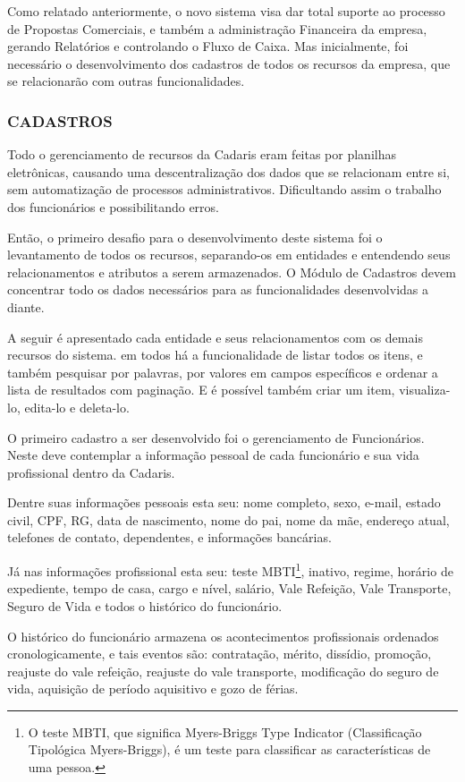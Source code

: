 \documentclass[
  12pt,				%
  openany,
  oneside,
  a4paper,			%
  english,			%
  brazil
]{article}
\numberwithin{figure}{section}
\numberwithin{table}{section}
\newcounter{subsubsubsection}[subsubsection]
\begin{document}
Como relatado anteriormente, o novo sistema visa dar total suporte ao processo de Propostas Comerciais, e também a administração Financeira da empresa, gerando Relatórios e controlando o Fluxo de Caixa. Mas inicialmente, foi necessário o desenvolvimento dos cadastros de todos os recursos da empresa, que se relacionarão com outras funcionalidades.


\subsubsection{CADASTROS}
Todo o gerenciamento de recursos da Cadaris eram feitas por planilhas eletrônicas, causando uma descentralização dos dados que se relacionam entre si, sem automatização de processos administrativos. Dificultando assim o trabalho dos funcionários e possibilitando erros.

Então, o primeiro desafio para o desenvolvimento deste sistema foi o levantamento de todos os recursos, separando-os em entidades e entendendo seus relacionamentos e atributos a serem armazenados. O Módulo de Cadastros devem concentrar todo os dados necessários para as funcionalidades desenvolvidas a diante.

A seguir é apresentado cada entidade e seus relacionamentos com os demais recursos do sistema. em todos há a funcionalidade de listar todos os itens, e também pesquisar por palavras, por valores em campos específicos e ordenar a lista de resultados com paginação. E é possível também criar um item, visualiza-lo, edita-lo e deleta-lo.



O primeiro cadastro a ser desenvolvido foi o gerenciamento de Funcionários. Neste deve contemplar a informação pessoal de cada funcionário e sua vida profissional dentro da Cadaris. 

Dentre suas informações pessoais esta seu: nome completo, sexo, e-mail, estado civil, CPF, RG, data de nascimento, nome do pai, nome da mãe, endereço atual, telefones de contato, dependentes, e informações bancárias.

Já nas informações profissional esta seu: teste MBTI\footnote{O teste MBTI, que significa Myers-Briggs Type Indicator (Classificação Tipológica Myers-Briggs), é um teste para classificar as características de uma pessoa.}, inativo, regime, horário de expediente, tempo de casa, cargo e nível, salário, Vale Refeição, Vale Transporte, Seguro de Vida e todos o histórico do funcionário.

O histórico do funcionário armazena os acontecimentos profissionais ordenados cronologicamente, e tais eventos são: contratação, mérito, dissídio, promoção, reajuste do vale refeição, reajuste do vale transporte, modificação do seguro de vida, aquisição de período aquisitivo e gozo de férias.
\end{document}
